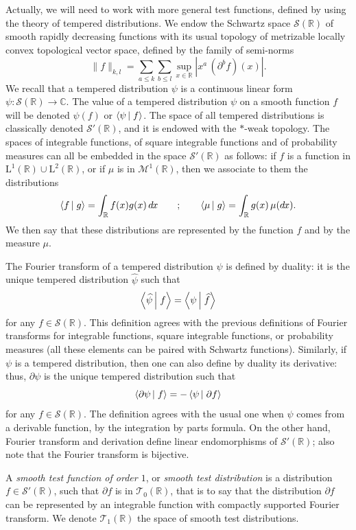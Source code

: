 \documentclass[envcountsame]{svmult}
\newcommand{\R}{\mathbb{R}}
\newcommand{\C}{\mathbb{C}}
\newcommand{\leb}{\mathrm{L}}
\newcommand{\testf}{\mathscr{T}}
\newcommand{\schwartz}{\mathscr{S}}
\newcommand{\scal}[2]{\left\langle #1\vphantom{#2}\,\right |\left.#2 \vphantom{#1}\right\rangle}
\newcommand{\DD}[1]{\,d\hspace*{-0.3mm}{#1}}
\begin{document}
Actually, we will need to work with more general test functions, defined by using the theory of tempered distributions. We endow the Schwartz space $\schwartz(\R)$ of smooth rapidly decreasing functions with its usual topology of metrizable locally convex topological vector space, defined by the family of semi-norms
$$\|f\|_{k,l} = \sum_{a \leq k}\sum_{b \leq l}\sup_{x \in \R} |x^a \,(\partial^b f)(x)| .$$
We recall that a tempered distribution $\psi$ is a continuous linear form $\psi : \schwartz(\R) \to \C$. The value of a tempered distribution $\psi$ on a smooth function $f$ will be denoted $\psi(f)$ or $\scal{\psi}{f}$. The space of all tempered distributions is classically denoted $\schwartz'(\R)$, and it is endowed with the $*$-weak topology.
The spaces of integrable functions, of square integrable functions and of probability measures 
can all be embedded in the space $\schwartz'(\R)$ as follows: if $f$ is a function in \hbox{$\leb^1(\R) \cup \leb^2(\R)$}, or if $\mu$ is in $\mathscr{M}^{1}(\R)$, then we associate to them the distributions
$$\scal{f}{g}=\int_\R f(x) g(x) \DD{x}\qquad;\qquad \scal{\mu}{g} = \int_\R g(x)\, \mu(\!\DD{x}).$$
We then say that these distributions are represented by the function $f$ and by the measure $\mu$.\medskip

The Fourier transform of a tempered distribution $\psi$ is defined by duality: it is the unique tempered distribution $\widehat{\psi}$ such that
$$\scal{\widehat{\psi}}{f} = \scal{\psi}{\widehat{f}}$$
for any $f \in \schwartz(\R)$. This definition agrees with the previous definitions of Fourier transforms for integrable functions, square integrable functions, or probability measures (all these elements can be paired with Schwartz functions).
Similarly, if $\psi$ is a tempered distribution, then one can also define by duality its derivative: thus, $\partial\psi$ is the unique tempered distribution such that
$$\scal{\partial\psi}{f} = -\scal{\psi}{\partial f}$$
for any $f \in \schwartz(\R)$. The definition agrees with the usual one when $\psi$ comes from a derivable function, by the integration by parts formula. On the other hand, Fourier transform and
derivation define linear endomorphisms of $\schwartz'(\R)$; also note that the Fourier transform is bijective.
\begin{definition}
A \emph{smooth test function of order $1$}, or \emph{smooth test distribution} is a distribution $f \in \schwartz'(\R)$, such that $\partial f$ is in $\testf_0(\R)$, that is to say that the distribution $\partial f$ can be represented by an integrable function with compactly supported Fourier transform. We denote $\testf_1(\R)$ the space of smooth test distributions.
\end{definition}
\end{document}
